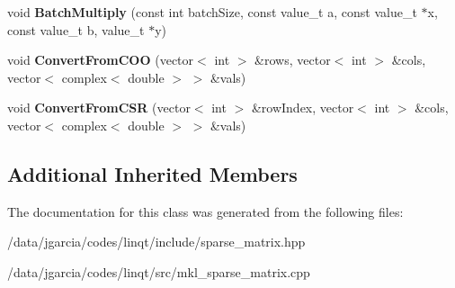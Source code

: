 \begin{DoxyCompactItemize}
\item 
void {\bfseries Batch\+Multiply} (const int batch\+Size, const value\+\_\+t a, const value\+\_\+t $\ast$x, const value\+\_\+t b, value\+\_\+t $\ast$y)\hypertarget{class_sparse_matrix_type_ab708db3441938be5ef65a9450f4af298}{}\label{class_sparse_matrix_type_ab708db3441938be5ef65a9450f4af298}

\item 
void {\bfseries Convert\+From\+C\+OO} (vector$<$ int $>$ \&rows, vector$<$ int $>$ \&cols, vector$<$ complex$<$ double $>$ $>$ \&vals)\hypertarget{class_sparse_matrix_type_aacc74467c65c6370fb335944b3988972}{}\label{class_sparse_matrix_type_aacc74467c65c6370fb335944b3988972}

\item 
void {\bfseries Convert\+From\+C\+SR} (vector$<$ int $>$ \&row\+Index, vector$<$ int $>$ \&cols, vector$<$ complex$<$ double $>$ $>$ \&vals)\hypertarget{class_sparse_matrix_type_a531b65d0596e5044c55be1253fe59559}{}\label{class_sparse_matrix_type_a531b65d0596e5044c55be1253fe59559}

\end{DoxyCompactItemize}
\subsection*{Additional Inherited Members}


The documentation for this class was generated from the following files\+:\begin{DoxyCompactItemize}
\item 
/data/jgarcia/codes/linqt/include/sparse\+\_\+matrix.\+hpp\item 
/data/jgarcia/codes/linqt/src/mkl\+\_\+sparse\+\_\+matrix.\+cpp\end{DoxyCompactItemize}
